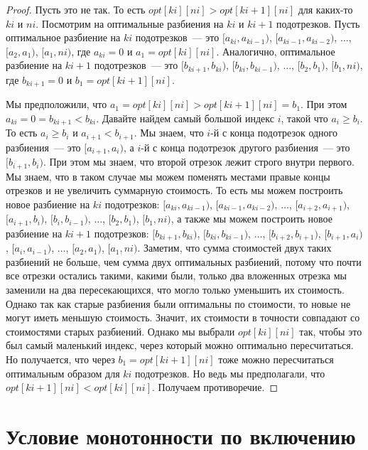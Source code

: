 \begin{proof}
    Пусть это не так. То есть $opt[ki][ni] > opt[ki + 1][ni]$ для каких-то $ki$ и $ni$. Посмотрим на оптимальные разбиения на $ki$ и $ki + 1$ подотрезков. Пусть оптимальное разбиение на $ki$ подотрезков~--- это $[a_{ki}, a_{ki-1})$, $[a_{ki-1}, a_{ki-2})$, $\ldots$, $[a_2, a_1)$, $[a_1, ni)$, где $a_{ki} = 0$ и $a_1 = opt[ki][ni]$. Аналогично, оптимальное разбиение на $ki + 1$ подотрезков~--- это $[b_{ki + 1}, b_{ki})$, $[b_{ki}, b_{ki-1})$, $\ldots$, $[b_2, b_1)$, $[b_1, ni)$, где $b_{ki + 1} = 0$ и $b_1 = opt[ki + 1][ni]$.

    Мы предположили, что $a_1 = opt[ki][ni] > opt[ki + 1][ni] = b_1$. При этом $a_{ki} = 0 = b_{ki + 1} < b_{ki}$. Давайте найдем самый большой индекс $i$, такой что $a_i \ge b_i$. То есть $a_i \ge b_i$ и $a_{i + 1} < b_{i + 1}$. Мы знаем, что $i$-й с конца подотрезок одного разбиения~--- это $[a_{i + 1}, a_i)$, а $i$-й с конца подотрезок другого разбиения~--- это $[b_{i + 1}, b_i)$. При этом мы знаем, что второй отрезок лежит строго внутри первого. Мы знаем, что в таком случае мы можем поменять местами правые концы отрезков и не увеличить суммарную стоимость. То есть мы можем построить новое разбиение на $ki$ подотрезков: $[a_{ki}, a_{ki - 1})$, $[a_{ki - 1}, a_{ki - 2})$, $\ldots$, $[a_{i + 2}, a_{i + 1})$, $[a_{i + 1}, b_i)$, $[b_i, b_{i - 1})$, $\ldots$, $[b_2, b_1)$, $[b_1, ni)$, а также мы можем построить новое разбиение на $ki + 1$ подотрезков: $[b_{ki + 1}, b_{ki})$, $[b_{ki}, b_{ki-1})$, $\ldots$, $[b_{i + 2}, b_{i + 1})$, $[b_{i + 1}, a_i)$, $[a_i, a_{i - 1})$, $\ldots$, $[a_2, a_1)$, $[a_1, ni)$. Заметим, что сумма стоимостей двух таких разбиений не больше, чем сумма двух оптимальных разбиений, потому что почти все отрезки остались такими, какими были, только два вложенных отрезка мы заменили на два пересекающихся, что могло только уменьшить их стоимость. Однако так как старые разбиения были оптимальны по стоимости, то новые не могут иметь меньшую стоимость. Значит, их стоимости в точности совпадают со стоимостями старых разбиений. Однако мы выбрали $opt[ki][ni]$ так, чтобы это был самый маленький индекс, через который можно оптимально пересчитаться. Но получается, что через $b_1 = opt[ki + 1][ni]$ тоже можно пересчитаться оптимальным образом для $ki$ подотрезков. Но ведь мы предполагали, что $opt[ki + 1][ni] < opt[ki][ni]$. Получаем противоречие.
\end{proof}

\section{Условие монотонности по включению}

